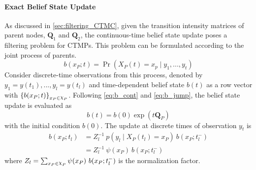 \paragraph*{Exact Belief State Update}
\label{par:bs_exact}
As discussed in \cref{sec:filtering_CTMC}, given the transition intensity matrices of parent nodes, $ \textbf{Q}_1 $ and $ \textbf{Q}_2 $, the continuous-time belief state update poses a filtering problem for CTMPs. This problem can be formulated according to the joint process of parents.
\begin{equation}
b(x_P; t) = \operatorname{Pr}( X_P(t) = x_{p} \mid y_{1}, ..., y_{t})
\end{equation}
Consider discrete-time observations from this process, denoted by $ y_{1}=y(t_{1}), ..., y_{l}=y(t_{l}) $ and time-dependent belief state $ b(t) $ as a row vector with $ \left\lbrace b(x_P;t)\right\rbrace_{x_P \in \rchi_P} $. Following \autoref{eq:b_cont} and \autoref{eq:b_jump}, the belief state update is evaluated as
\begin{equation}
b(t) = b(0) \exp(t\textbf{Q}_P)
\end{equation}
with the initial condition $ b(0) $.
The update at discrete times of observation $ y_{t} $ is
\begin{align}
b(x_P; t_{l}) &= Z_{l}^{-1}\ {p(y_{l} \mid X_P(t_{l})=x_P)}\ {b(x_P; t_{l}^{-})} \\ & = Z_{l}^{-1}\ \psi(x_P) \ {b(x_P; t_{l}^{-})}
\label{eq:bs_exact}
\end{align}
where $ Z_{l} = \sum_{x_P\in \rchi_P} \psi(x_P)\ b(x_P; t_{l}^{-}) $ is the normalization factor.
